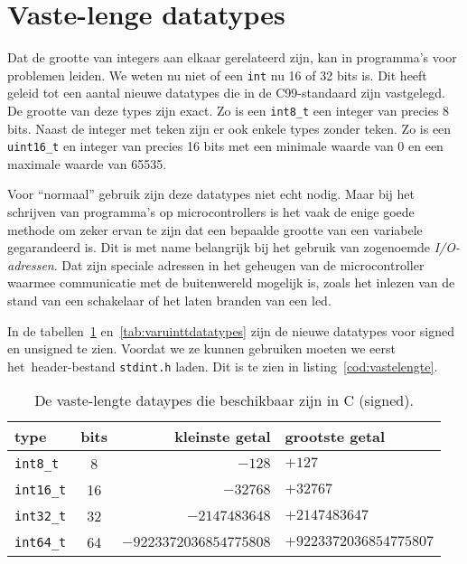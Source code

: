 \section{Vaste-lenge datatypes}
Dat de grootte van integers aan elkaar gerelateerd zijn, kan in programma's voor problemen leiden. We weten nu niet of een \texttt{int} nu 16 of 32 bits is. Dit heeft geleid tot een aantal nieuwe datatypes die in de C99-standaard zijn vastgelegd. De grootte van deze types zijn exact. Zo is een \texttt{int8\_t} een integer van precies 8 bits. Naast de integer met teken zijn er ook enkele types zonder teken. Zo is een \texttt{uint16\_t} en integer van precies 16 bits met een minimale waarde van 0 en een maximale waarde van 65535.

Voor ``normaal'' gebruik zijn deze datatypes niet echt nodig. Maar bij het schrijven van programma's op microcontrollers is het vaak de enige goede methode om zeker ervan te zijn dat een bepaalde grootte van een variabele gegarandeerd is. Dit is met name belangrijk bij het gebruik van zogenoemde \textsl{I/O-adressen}. Dat zijn speciale adressen in het geheugen van de microcontroller waarmee communicatie met de buitenwereld mogelijk is, zoals het inlezen van de stand van een schakelaar of het laten branden van een led.

In de tabellen~\ref{tab:varinttdatatypes} en~\ref{tab:varuinttdatatypes} zijn de nieuwe datatypes voor signed en unsigned te zien. Voordat we ze kunnen gebruiken moeten we eerst het\ header-bestand \texttt{stdint.h} laden. Dit is te zien in listing~\ref{cod:vastelengte}.

\begin{table}[!ht]
\centering
\caption{De vaste-lengte dataypes die beschikbaar zijn in C (signed).}
\label{tab:varinttdatatypes}
\begin{tabular}{@{}lcrl@{}}
\toprule
\textbf{type}          & \textbf{bits} & \textbf{kleinste getal} &  \textbf{grootste getal} \\ \midrule
\texttt{int8\_t}       & 8             & $-128$                  & $+127$  \\
\texttt{int16\_t}      & 16            & $-32768$                & $+32767$  \\
\texttt{int32\_t}      & 32            & $-2147483648$           & $+2147483647$  \\
\texttt{int64\_t}      & 64            & $-9223372036854775808$  & $+9223372036854775807$  \\
\bottomrule
\end{tabular}\\
\end{table}

